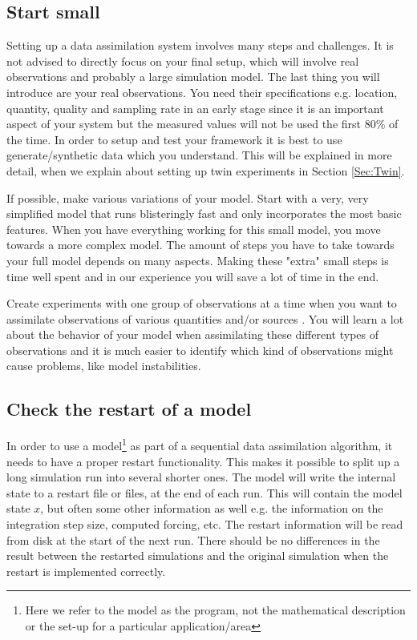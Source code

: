 \subsection{Start small}
Setting up a data assimilation system involves many steps and challenges. It is not advised to directly focus on your final setup, which will involve real observations and probably a large simulation model. The last thing you will introduce are your real observations. You need their specifications e.g. location, quantity, quality and sampling rate in an early stage since it is an important aspect of your system but the measured values will not be used the first 80\% of the time. In order to setup and test your framework it is best to use generate/synthetic data which you understand. This will be explained in more detail, when we explain about setting up twin experiments in Section \ref{Sec:Twin}.

If possible, make various variations of your model. Start with a very, very simplified model that runs blisteringly fast and only incorporates the most basic features. When you have everything working for this small model, you move towards a more complex model. The amount of steps you have to take towards your full model depends on many aspects. Making these "extra" small steps is time well spent and in our experience you will save a lot of time in the end. 

Create experiments with one group of observations at a time when you want to assimilate observations of various quantities and/or sources . You will learn a lot about the behavior of your model when assimilating these different types of observations and it is much easier to identify which kind of observations might cause problems, like model instabilities.

\subsection{Check the restart of a model}
In order to use a model\footnote{Here we refer to the model as the program, not the mathematical description or the set-up for a particular application/area} as part of a sequential data assimilation algorithm, it needs to have a proper restart functionality. This makes it possible to split up a long simulation run into several shorter ones. The model will write the internal state to a restart file or files, at the end of each run. This will contain the model state $x$, but often some other information as well e.g. the information on the integration step size, computed forcing, etc. The restart information will be read from disk at the start of the next run. There should be no differences in the result between the restarted simulations and the original simulation when the restart is implemented correctly. 

